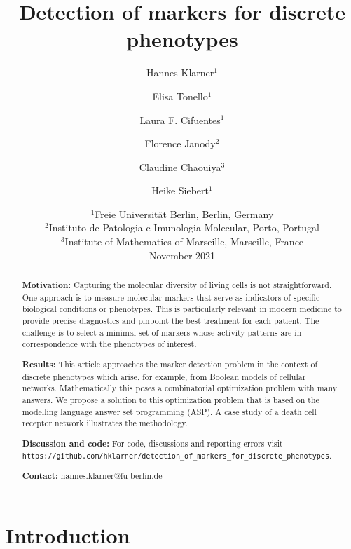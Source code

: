 \documentclass[11pt]{article}
\begin{document}
    \title{Detection of markers for discrete phenotypes}
    \author{Hannes Klarner$^1$ \and Elisa Tonello$^1$ \and Laura F. Cifuentes$^1$ \and Florence Janody$^2$ \and Claudine Chaouiya$^3$ \and Heike Siebert$^1$}
    \date{%
        $^1$Freie Universität Berlin, Berlin, Germany\\%
        $^2$Instituto de Patologia e Imunologia Molecular, Porto, Portugal\\%
        $^3$Institute of Mathematics of Marseille, Marseille, France\\[2ex]%
        November 2021
    }
    \maketitle

    \begin{abstract}
        \textbf{Motivation:}
        Capturing the molecular diversity of living cells is not straightforward.
        One approach is to measure molecular markers that serve as indicators of specific biological conditions or phenotypes.
        This is particularly relevant in modern medicine to provide precise diagnostics and pinpoint the best treatment for each patient.
        The challenge is to select a minimal set of markers whose activity patterns are in correspondence with the phenotypes of interest.

        \textbf{Results:}
        This article approaches the marker detection problem in the context of discrete phenotypes which arise, for example, from Boolean models of cellular networks.
        Mathematically this poses a combinatorial optimization problem with many answers.
        We propose a solution to this optimization problem that is based on the modelling language answer set programming (ASP).
        A case study of a death cell receptor network illustrates the methodology.

        \textbf{Discussion and code:}
        For code, discussions and reporting errors visit \verb+https://github.com/hklarner/detection_of_markers_for_discrete_phenotypes+.

        \textbf{Contact:}
        hannes.klarner@fu-berlin.de
    \end{abstract}

    \section{Introduction}
\end{document}
